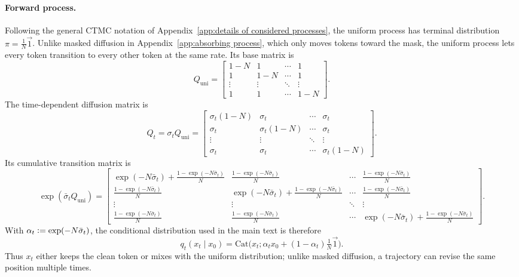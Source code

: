 \begin{reviewblock}
\paragraph{Forward process.}
Following the general CTMC notation of Appendix~\ref{app:details of considered processes}, the uniform process has terminal distribution $\pi=\frac{1}{N}\vec{1}$. Unlike masked diffusion in Appendix~\ref{app:absorbing process}, which only moves tokens toward the mask, the uniform process lets every token transition to every other token at the same rate. Its base matrix is
\begin{equation}
    Q_{\text{uni}} =
    \begin{bmatrix}
        1 - N & 1 & \cdots & 1 \\
        1 & 1 - N & \cdots & 1 \\
        \vdots & \vdots & \ddots & \vdots \\
        1 & 1 & \cdots & 1 - N
    \end{bmatrix}.
\end{equation}
The time-dependent diffusion matrix is
\begin{equation}
\label{eq: uniform diffusion matrix}
    Q_t = \sigma_t Q_{\text{uni}} =
    \begin{bmatrix}
        \sigma_t(1 - N) & \sigma_t & \cdots & \sigma_t \\
        \sigma_t & \sigma_t(1 - N) & \cdots & \sigma_t \\
        \vdots & \vdots & \ddots & \vdots \\
        \sigma_t & \sigma_t & \cdots & \sigma_t(1 - N)
    \end{bmatrix}.
\end{equation}
Its cumulative transition matrix is
\begin{equation}
    \exp(\bar{\sigma}_t Q_{\text{uni}}) =
    \begin{bmatrix}
        \exp(-N\bar{\sigma}_t) + \frac{1-\exp(-N\bar{\sigma}_t)}{N}
        & \frac{1-\exp(-N\bar{\sigma}_t)}{N} & \cdots & \frac{1-\exp(-N\bar{\sigma}_t)}{N} \\
        \frac{1-\exp(-N\bar{\sigma}_t)}{N}
        & \exp(-N\bar{\sigma}_t) + \frac{1-\exp(-N\bar{\sigma}_t)}{N}
        & \cdots & \frac{1-\exp(-N\bar{\sigma}_t)}{N} \\
        \vdots & \vdots & \ddots & \vdots \\
        \frac{1-\exp(-N\bar{\sigma}_t)}{N}
        & \frac{1-\exp(-N\bar{\sigma}_t)}{N}
        & \cdots & \exp(-N\bar{\sigma}_t) + \frac{1-\exp(-N\bar{\sigma}_t)}{N}
    \end{bmatrix}.
\end{equation}
With $\alpha_t \vcentcolon= \exp(-N\bar{\sigma}_t)$, the conditional distribution used in the main text is therefore
\[
    q_t(x_t\mid x_0)
    = \mathrm{Cat}\bigl(x_t;\alpha_t x_0 + (1-\alpha_t)\tfrac{1}{N}\vec{1}\bigr).
\]
Thus $x_t$ either keeps the clean token or mixes with the uniform distribution; unlike masked diffusion, a trajectory can revise the same position multiple times.


\end{reviewblock}
